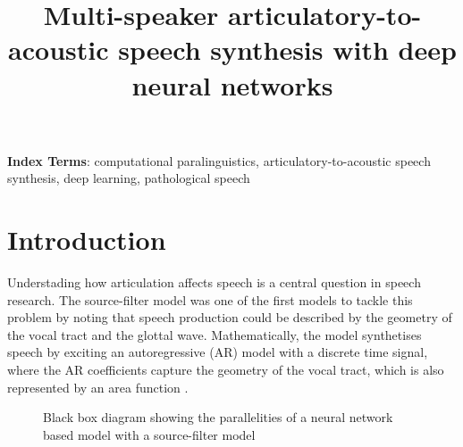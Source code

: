 \documentclass[a4paper]{article}
\title{Multi-speaker articulatory-to-acoustic speech synthesis with
deep neural networks}
\begin{document}
\maketitle
% 
\begin{abstract}
  \blindtext[1]
\end{abstract}
\noindent\textbf{Index Terms}: computational paralinguistics, articulatory-to-acoustic
speech synthesis, deep learning, pathological speech

\section{Introduction}

Understading how articulation affects speech is a central question in speech
research. The source-filter model was one of the first models to tackle this
problem by noting that speech production could be described by
the geometry of the vocal tract and the glottal wave. Mathematically,
the model synthetises speech by exciting an autoregressive (AR) model with a
discrete time signal, where the AR coefficients capture the geometry of the
vocal tract, which is also represented by an area function \cite{Benesty2009}. 

\begin{figure}[t]
  \begin{center}

 \caption{Black box diagram showing the parallelities of a neural network
   based model with a source-filter model}
  \label{fig1}
    \end{center}
  \end{figure}
\end{document}
